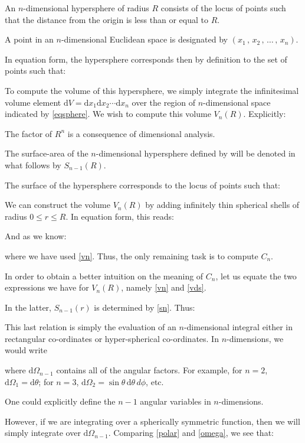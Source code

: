 {	An $n$-dimensional hypersphere of radius $R$ consists of the locus of points such that the distance from the origin is less than or equal to $R$.
	
	A point in an $n$-dimensional Euclidean space is designated by $(x_1\,,\,x_2\,,\,\ldots\,,\,x_n)$.

	In equation form, the hypersphere corresponds then by definition to the set of points such that:
	
	To compute the volume of this hypersphere, we simply integrate the infinitesimal volume element $\mathrm{d}V=\mathrm{d}x_1 \mathrm{d}x_2\cdots \mathrm{d}x_n$ over the region of $n$-dimensional space indicated by \ref{eqsphere}.  We wish to compute this volume $V_n(R)$. Explicitly:
	
	The factor of $R^n$ is a consequence of dimensional analysis.
	
	The surface-area of the $n$-dimensional hypersphere defined by will be denoted in what follows by $S_{n-1}(R)$.
	
	The surface of the hypersphere corresponds to the locus of points such that:
	
	We can construct the volume $V_n(R)$ by adding infinitely thin spherical shells of radius $0\leq r\leq R$.  In equation form, this reads:
	
	And as we know:
	
	where we have used \ref{vn}.  Thus, the only remaining task is to compute $C_n$.
	
	In order to obtain a better intuition on the meaning of $C_n$, let us equate the two expressions we have for $V_n(R)$, namely \ref{vn} and \ref{vds}.
	
	In the latter, $S_{n-1}(r)$ is determined by \ref{sn}.  Thus:
	
	This last relation is simply the evaluation of an $n$-dimensional integral either in rectangular co-ordinates or hyper-spherical co-ordinates.  In $n$-dimensions,
	we would write
	
	where $\mathrm{d}\Omega_{n-1}$ contains all of the angular factors.  For example, for
	$n=2$, $\mathrm{d}\Omega_1=\mathrm{d}\theta$;  for $n=3$, $\mathrm{d}\Omega_2=\sin\theta\, \mathrm{d}\theta\, d\phi$, etc.
	
	One could explicitly define the $n-1$ angular variables in $n$-dimensions.
	
	However, if we are integrating over a spherically symmetric function, then
	we will simply integrate over $\mathrm{d}\Omega_{n-1}$. Comparing \ref{polar} and \ref{omega},
	we see that:
	
}
